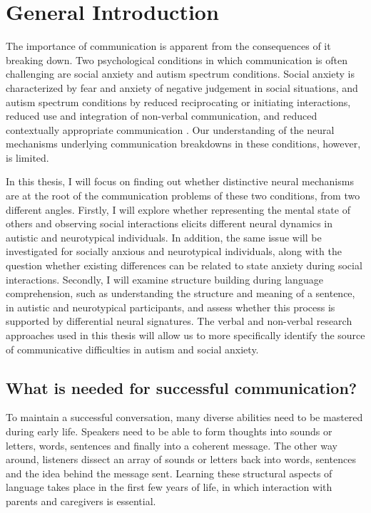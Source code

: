 \chapter{General Introduction}
\label{ch:introduction}
\thispagestyle{empty}

The importance of communication is apparent from the consequences of it breaking down. Two psychological conditions in which communication is often challenging are social anxiety and autism spectrum conditions. Social anxiety is characterized by fear and anxiety of negative judgement in social situations, and autism spectrum conditions by reduced reciprocating or initiating interactions, reduced use and integration of non-verbal communication, and reduced contextually appropriate communication \citep{apa2013}. Our understanding of the neural mechanisms underlying communication breakdowns in these conditions, however, is limited.

In this thesis, I will focus on finding out whether distinctive neural mechanisms are at the root of the communication problems of these two conditions, from two different angles. Firstly, I will explore whether representing the mental state of others and observing social interactions elicits different neural dynamics in autistic and neurotypical individuals. In addition, the same issue will be investigated for socially anxious and neurotypical individuals, along with the question whether existing differences can be related to state anxiety during social interactions. Secondly, I will examine structure building during language comprehension, such as understanding the structure and meaning of a sentence, in autistic and neurotypical participants, and assess whether this process is supported by differential neural signatures. The verbal and non-verbal research approaches used in this thesis will allow us to more specifically identify the source of communicative difficulties in autism and social anxiety. 

\section{What is needed for successful communication?}

To maintain a successful conversation, many diverse abilities need to be mastered during early life. Speakers need to be able to form thoughts into sounds or letters, words, sentences and finally into a coherent message. The other way around, listeners dissect an array of sounds or letters back into words, sentences and the idea behind the message sent. Learning these structural aspects of language takes place in the first few years of life, in which interaction with parents and caregivers is essential. 

